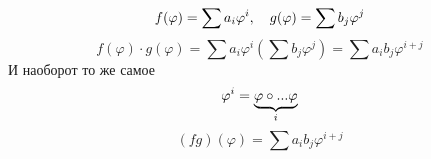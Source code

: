 \documentclass[algebra]{subfiles}
\begin{document}
    \begin{Proof}
        \[f(\varphi) = \sum a_i \varphi^i,\q g(\varphi) = \sum b_j \varphi^j\]
        \[f(\varphi) \cdot g(\varphi) = \sum a_i \varphi^i (\sum b_j \varphi^j) = \sum a_i b_j \varphi^{i+j}\]
        И наоборот то же самое
        \[\varphi^i = \ub{i}{\varphi \circ ... \varphi}\]
        \[(fg) (\varphi) = \sum a_i b_j \varphi^{i+j}\]
    \end{Proof}
\end{document}
